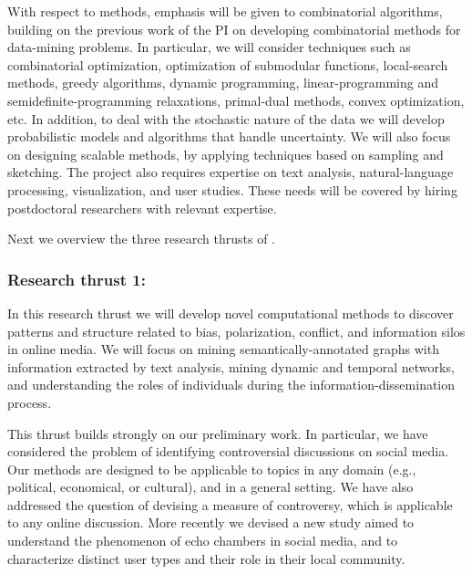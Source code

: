\documentclass[a4paper,11pt]{article}
\begin{document}
\smallskip
With respect to methods, 
emphasis will be given to combinatorial algorithms,
building on the previous work of the PI 
on developing combinatorial methods for data-mining problems.
In particular, we will consider techniques such as 
combinatorial optimization, 
optimization of submodular functions, 
local-search methods, 
greedy algorithms, 
dynamic pro\-gram\-ming, 
linear-pro\-gram\-ming and semi\-def\-ini\-te-pro\-gram\-ming relaxations, 
primal-dual methods, convex optimization, etc. 
In addition, to deal with the stochastic nature of the data 
we will develop probabilistic models and algorithms that handle uncertainty.
We will also focus on designing scalable methods, 
by applying techniques based on sampling and sketching. 
The project also requires expertise on text analysis, 
natural-language processing, visualization, and user studies. 
These needs will be covered by hiring postdoctoral researchers with relevant expertise.

\smallskip
Next we overview the three research thrusts of \acronym.

\subsubsection*{Research thrust 1: \discover}

\noindent
\hspace{-3mm}\colorbox{verylightmagenta}{
\begin{minipage}{\textwidth}
In this research thrust we will develop novel computational methods 
to discover patterns and structure related to 
bias, polarization, conflict, and information silos in online media.
We will focus on mining se\-man\-ti\-cal\-ly-annotated graphs
with information extracted by text analysis, 
mining dynamic and temporal networks, 
and understanding the roles of individuals 
during the information-dissemination process. 
\end{minipage}}

\medskip
This thrust builds strongly on our preliminary work.
In particular, we have considered the problem 
of identifying controversial discussions on social media.%
Our methods are designed to be applicable to topics in any domain 
(e.g., political, economical, or cultural), and in a general setting.
We have also addressed the question of devising a measure of controversy,
which is applicable to any online discussion.
More recently we devised a new study aimed to 
understand the phenomenon of echo chambers in social media, 
and to characterize distinct user types and their role in their local community. %
\end{document}
